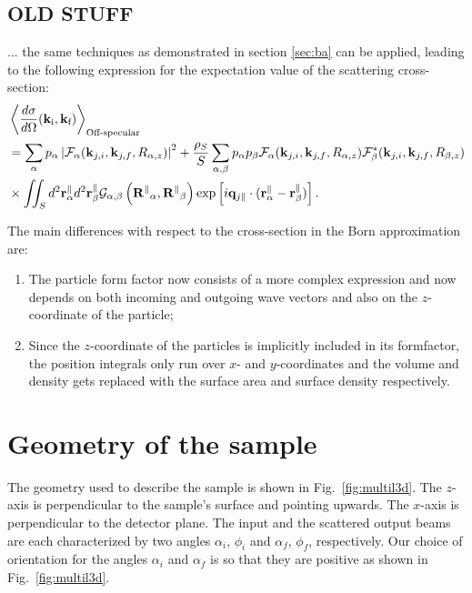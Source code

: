 \subsection{OLD STUFF}

... the same techniques as demonstrated in section \ref{sec:ba} can be applied, leading to the following expression for the expectation value of the scattering cross-section:
\begin{align*}
  & \left\langle \frac{d\sigma}{d\Omega}(\mathbf{k}_\text{i},\mathbf{k}_\text{f}) \right\rangle_{\text{Off-specular}}  \\
  & = \sum_\alpha p_\alpha \left\lvert \mathcal{F}_\alpha(\mathbf{k}_{j,i},\mathbf{k}_{j,f}, R_{\alpha,z})\right\rvert ^2 + \frac{\rho_S}{S}\sum_{\alpha,\beta} p_\alpha p_\beta \mathcal{F}_\alpha (\mathbf{k}_{j,i},\mathbf{k}_{j,f}, R_{\alpha,z})\mathcal{F}_\beta^*(\mathbf{k}_{j,i},\mathbf{k}_{j,f}, R_{\beta,z}) \\
  & \times \iint_S d^2\mathbf{r}_\alpha^\parallel d^2\mathbf{r}_\beta^\parallel \mathcal{G}_{\alpha ,\beta}\left( \mathbf{R^\parallel}_{\alpha} , \mathbf{R^\parallel}_{\beta} \right) \exp \left[ i\mathbf{q}_{j\parallel}\cdot (\mathbf{r}_\alpha^\parallel - \mathbf{r}_\beta^\parallel ) \right].
\end{align*}

The main differences with respect to the cross-section in the Born approximation are:
\begin{enumerate}
  \item The particle form factor now consists of a more complex expression and now depends on both incoming and outgoing wave vectors and also on the $z$-coordinate of the particle;
  \item Since the $z$-coordinate of the particles is implicitly included in its formfactor, the position integrals only run over $x$- and $y$-coordinates and the volume and density gets replaced with the surface area and surface density respectively.
\end{enumerate}

\section{Geometry of the sample}

\noindent The geometry used to describe the sample is
shown in Fig.~\ref{fig:multil3d}. The $z$-axis is perpendicular to the sample's
surface and pointing upwards. The $x$-axis  is perpendicular to the
detector plane. The input and the
scattered output beams are each characterized by two angles
$\alpha_i$, $\phi_i$ and $\alpha_f$, $\phi_f$, respectively. Our choice of orientation for the
angles $\alpha_i$ and $\alpha_f$ is so that they are positive
as shown in Fig.~\ref{fig:multil3d}. \\

